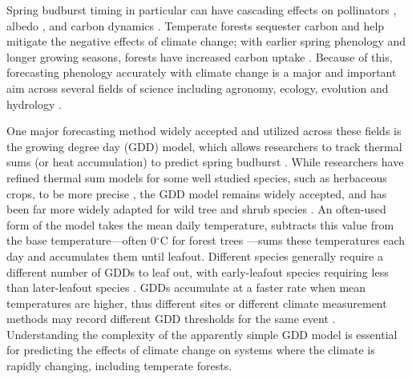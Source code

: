 \documentclass{article}\usepackage[]{graphicx}\usepackage[]{color}
\begin{document}
Spring budburst timing in particular can have cascading effects on pollinators \citep{Boggs2012, Pardee2017}, albedo \citep{Williamson2016}, and carbon dynamics \citep{Richardson2013}. Temperate forests sequester carbon and help mitigate the negative effects of climate change; with earlier spring phenology and longer growing seasons, forests have increased carbon uptake \citep{Keenan2014}. Because of this, forecasting phenology accurately with climate change is a major and important aim across several fields of science including agronomy, ecology, evolution and hydrology \citep{Moorcroft2001,Bolton2013,Yu2016,Taylor2020}. 
  
One major forecasting method widely accepted and utilized across these fields is the growing degree day (GDD) model, which allows researchers to track thermal sums (or heat accumulation) to predict spring budburst \citep{Schwartz2006,Vitasse2011,Cook2012,Phillimore2013,Crimmins2020}. While researchers have refined thermal sum models for some well studied species, such as herbaceous crops, to be more precise \citep{Kumudini2014,Abendroth2019}, the GDD model remains widely accepted, and has been far more widely adapted for wild tree and shrub species \citep{Yu2016,Klosterman2018,Montgomery2020}. An often-used form of the model takes the mean daily temperature, subtracts this value from the base temperature---often 0$^{\circ}$C for forest trees \citep[as estimates are proven to be more accurate,][]{Man2010}---sums these temperatures each day and accumulates them until leafout. Different species generally require a different number of GDDs to leaf out, with early-leafout species requiring less than later-leafout species \citep{Fahey2016,Crimmins2020,Marquis2020}. GDDs accumulate at a faster rate when mean temperatures are higher, thus different sites or different climate measurement methods may record different GDD thresholds for the same event \citep{Bonhomme2000}. Understanding the complexity of the apparently simple GDD model is essential for predicting the effects of climate change on systems where the climate is rapidly changing, including temperate forests. 
\end{document}
